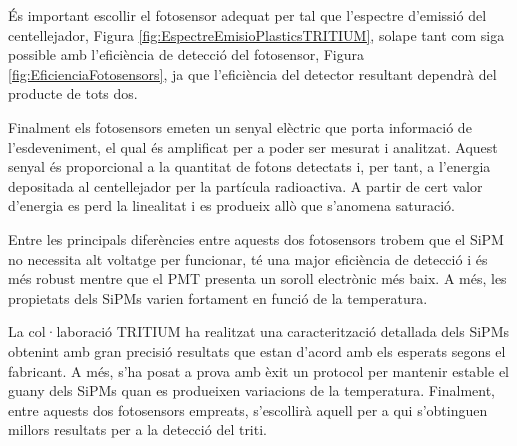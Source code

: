 És important escollir el fotosensor adequat per tal que l'espectre d'emissió del centellejador, Figura \ref{fig:EspectreEmisioPlasticsTRITIUM}, solape tant com siga possible amb l'eficiència de detecció del fotosensor, Figura \ref{fig:EficienciaFotosensors}, ja que l'eficiència del detector resultant dependrà del producte de tots dos.

Finalment els fotosensors emeten un senyal elèctric que porta informació de l'esdeveniment, el qual és amplificat per a poder ser mesurat i analitzat. Aquest senyal és proporcional a la quantitat de fotons detectats i, per tant, a l'energia depositada al centellejador per la partícula radioactiva. A partir de cert valor d'energia es perd la linealitat i es produeix allò que s'anomena saturació.

Entre les principals diferències entre aquests dos fotosensors trobem que el SiPM no necessita alt voltatge per funcionar, té una major eficiència de detecció i és més robust mentre que el PMT presenta un soroll electrònic més baix. A més, les propietats dels SiPMs varien fortament en funció de la temperatura.

La col·laboració TRITIUM ha realitzat una caracterització detallada dels SiPMs obtenint amb gran precisió resultats que estan d'acord amb els esperats segons el fabricant. A més, s'ha posat a prova amb èxit un protocol per mantenir estable el guany dels SiPMs quan es produeixen variacions de la temperatura. Finalment, entre aquests dos fotosensors empreats, s'escollirà aquell per a qui s'obtinguen millors resultats per a la detecció del triti.